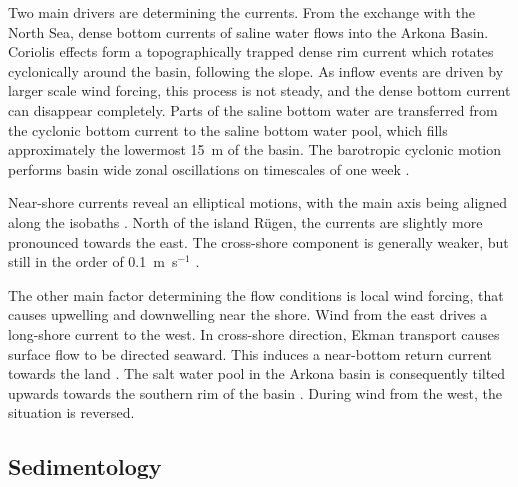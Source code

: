 Two main drivers are determining the currents. From the exchange with the North 
Sea, dense bottom currents of saline water flows into the Arkona Basin. 
Coriolis effects form a topographically trapped dense rim current which rotates 
cyclonically around the basin, following the slope. As inflow events are 
driven by larger scale wind forcing, this process is not steady, and the 
dense bottom current can disappear completely. Parts of the saline bottom water 
are transferred from the cyclonic bottom current to the saline bottom water 
pool, which fills approximately the lowermost 15~m of the basin. The barotropic 
cyclonic motion performs basin wide zonal oscillations on timescales of one 
week \citep[][]{lass2003}.

Near-shore currents reveal an elliptical motions, with the main axis 
being aligned along the isobaths \citep[][]{lass2003}. North of the island 
R\"{u}gen, the currents are slightly more pronounced towards the east. The 
cross-shore component is generally weaker, but still in the order of 
0.1~m~s$^{-1}$ \citep[][]{lass1993}. 

The other main factor determining the flow conditions is local wind forcing, 
that causes upwelling and downwelling near the shore. Wind from the east drives 
a long-shore current to the west. In cross-shore direction, Ekman 
transport causes surface flow to be directed seaward. This induces a 
near-bottom return current towards the land \citep[][]{lass1993}. The salt 
water pool in the Arkona basin is consequently tilted upwards towards the 
southern rim of the basin \citep[][]{lass2003}. During wind from the west, the 
situation is reversed. 

 \FloatBarrier
\subsection{Sedimentology}


